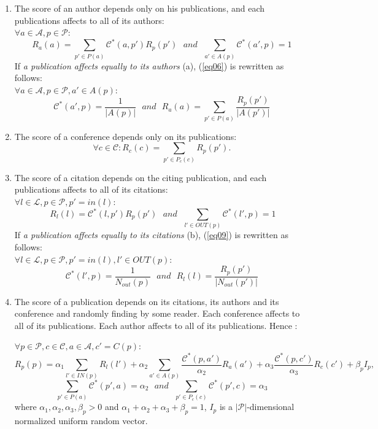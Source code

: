 \documentclass[10pt,leqno,twoside]{article}
\begin{document}
\begin{enumerate}
\item The score of an author depends only on his publications, and each publications affects to all of its authors: \\
$\forall a\in\mathcal{A},p\in\mathcal{P}:$
\begin{equation}\label{eq06}
R_a(a) = \sum_{p'\in P(a)} \mathcal{C}^*(a,p')R_p(p') ~~~and~~~\sum_{a'\in A(p)}\mathcal{C}^*(a',p)=1
\end{equation}
If \textit{a publication affects equally to its authors} (a), (\ref{eq06}) is rewritten as follows:\\
$\forall a\in\mathcal{A},p\in\mathcal{P}, a'\in A(p):$
\begin{equation}\label{eq07}
\mathcal{C}^*(a',p)= \frac{1}{|A(p)|}  ~~~and~~~ R_a(a) = \sum_{p'\in P(a)} \frac{R_p(p')}{|A(p')|}
\end{equation}
\item The score of a conference depends only on its publications:
\begin{equation}\label{eq08}
\forall c\in\mathcal{C}: R_c(c) = \sum_{p'\in P_c(c)} R_p(p').
\end{equation}

\item The score of a citation depends on the citing publication, and each publications affects to all of its citations: \\
$ \forall l\in\mathcal{L}, p \in \mathcal{P}, p'=in(l):$
\begin{equation}\label{eq09}
 ~R_l(l) =  \mathcal{C}^*(l,p')R_p(p') ~~~and ~~~ \sum_{l'\in OUT(p)}\mathcal{C}^*(l',p)=1
\end{equation}
If \textit{a publication affects equally to its citations} (b), (\ref{eq09}) is rewritten as follows:\\
$\forall l\in\mathcal{L}, p \in \mathcal{P}, p'=in(l), l'\in OUT(p):$
\begin{equation}\label{eq10}
 \mathcal{C}^*(l',p)= \frac{1}{N_{out}(p)} ~~~and~~~ R_l(l) =  \frac{R_p(p')}{|N_{out}(p')|}
\end{equation}
\item  The score of a publication depends on its citations, its authors and its conference and randomly finding by some reader. Each conference affects to all of its publications. Each author affects to all of its publications. Hence :

$\forall p\in\mathcal{P},  c\in\mathcal{C},  a\in\mathcal{A},c' = C(p):$
\setlength{\parskip}{3pt}
\begin{equation} \label {eq11}
R_p(p) = \alpha_1\sum_{l'\in IN(p)}R_l(l') +  \alpha_2 \sum_{a'\in A(p)}\frac{\mathcal{C}^*(p,a')}{\alpha_2}R_a(a') + \alpha_3\frac{\mathcal{C}^*(p,c')}{\alpha_3}R_c(c')+ \beta_pI_p,
\end{equation}
\begin{equation}\label{eq12}
\sum_{p'\in P(a)}\mathcal{C}^*(p',a)=\alpha_2~~~and~~~\sum_{p'\in P_c(c)}\mathcal{C}^*(p',c)=\alpha_3
\end{equation}
where $\alpha_1,\alpha_2,\alpha_3,\beta_p > 0$ and $\alpha_1 + \alpha_2 + \alpha_3 + \beta_p = 1$, $I_p$ is a $|\mathcal{P}|$-dimensional normalized uniform random vector.


\end{enumerate}
\end{document}

